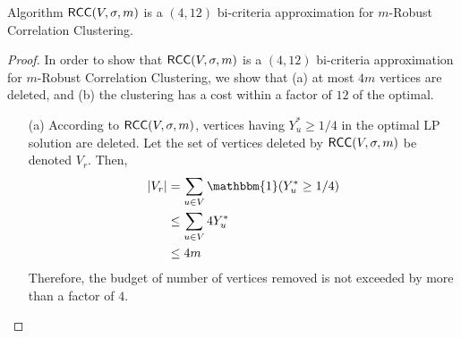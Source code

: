 \begin{theorem}
Algorithm ${\sf RCC} (V,\sigma,m)$ is a $(4,12)$ bi-criteria approximation for $m$-Robust Correlation Clustering.
\end{theorem}
\begin{proof}
In order to show that ${\sf RCC} (V,\sigma,m)$ is a $(4,12)$ bi-criteria approximation for $m$-Robust Correlation Clustering, we show that (a) at most $4m$ vertices are deleted, and (b) the clustering has a cost within a factor of $12$ of the optimal.

\begin{enumerate}
    \item[(a)] According to ${\sf RCC}(V,\sigma,m)$, vertices having $Y_u^* \ge 1/4$ in the optimal LP solution are deleted. Let the set of vertices deleted by ${\sf RCC} (V,\sigma,m)$ be denoted $V_r$. Then,
    \begin{align*}
        |V_r| &= \sum_{u \in V} \mathbbm{1} (Y_u^* \ge 1/4)\\
        &\le \sum_{u \in V} 4 Y_u^*\\
        &\le 4m
    \end{align*}
Therefore, the budget of number of vertices removed is not exceeded by more than a factor of $4$.\\


\end{enumerate}
\end{proof}
